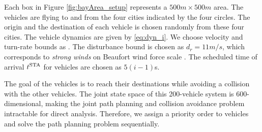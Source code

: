Each box in Figure \ref{fig:bayArea_setup} represents a $500m \times 500m$ area. The vehicles are flying to and from the four cities indicated by the four circles. The origin and the destination of each vehicle is chosen randomly from these four cities. The vehicle dynamics are given by \eqref{eq:dyn_i}. We choose velocity and turn-rate bounds as . The disturbance bound is chosen as $d_{r} = 11 m/s$, which corresponds to \textit{strong winds} on Beaufort wind force scale \cite{Windscale}. The scheduled time of arrival $t^\text{STA}$ for vehicles are chosen as $5(i-1)$s.

The goal of the vehicles is to reach their destinations while avoiding a collision with the other vehicles. The joint state space of this 200-vehicle system is 600-dimensional, making the joint path planning and collision avoidance problem intractable for direct analysis. Therefore, we assign a priority order to vehicles and solve the path planning problem sequentially.